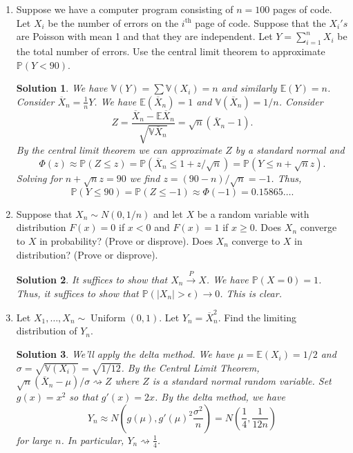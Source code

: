 \documentclass[10pt]{article}
\newtheorem*{sol}{Solution}
\renewcommand{\P}{\mathbb{P}}
\newcommand{\V}{\mathbb{V}}
\newcommand{\E}{\mathbb{E}}
\newcommand{\Unif}{\operatorname{Uniform}}
\newcommand{\toP}{\xrightarrow{P}}
\begin{document}
\begin{enumerate}
\item[(8)] Suppose we have a computer program consisting of $n = 100$ pages of
code. Let $X_i$ be the number of errors on the $i^{\text{th}}$ page of code.
Suppose that the $X_i's$ are Poisson with mean 1 and that they are independent.
Let $Y=\sum_{i=1}^n X_i$ be the total number of errors. Use the central limit
theorem to approximate $\P(Y<90)$.

\begin{sol}
We have $\V(Y)=\sum \V(X_i)=n$ and similarly $\E(Y)=n$.
Consider $\overline X_n=\frac{1}{n}Y$. We have $\E(\overline X_n)=1$
and $\V(\overline X_n)=1/n$. Consider
\[
Z = \frac{\overline X_n - \E \overline X_n}{\sqrt{\V \overline X_n}}
= \sqrt{n}(\overline X_n -1).
\]
By the central limit theorem we can approximate $Z$ by a standard normal and
\[
\Phi(z) \approx \P(Z\leq z) = \P(\overline X_n \leq 1 + z/\sqrt{n})
= \P(Y \leq n + \sqrt{n}z).
\]
Solving for $n+\sqrt{n}z=90$ we find $z=(90-n)/\sqrt{n}=-1$. Thus,
\[
\P(Y\leq 90) = \P(Z\leq -1) \approx \Phi(-1) = 0.15865\ldots.
\]
\end{sol}

\item[(11)] Suppose that $X_n\sim N(0,1/n)$ and let $X$ be a random variable with
distribution $F(x) = 0$ if $x<0$ and $F(x) = 1$ if $x\geq 0$. Does $X_n$ converge
to $X$ in probability? (Prove or disprove). Does $X_n$ converge to $X$ in
distribution? (Prove or disprove).

\begin{sol}
It suffices to show that $X_n\toP X$. We have $\P(X=0)=1$.
Thus, it suffices to show that $\P(|X_n|>\epsilon)\to 0$. This is clear.
\end{sol}

\item[(14)] Let $X_1,\ldots,X_n\sim \Unif(0,1)$. Let $Y_n=\overline X_n^2$.
Find the limiting distribution of $Y_n$.

\begin{sol}
We'll apply the delta method. We have $\mu=\E(X_i)=1/2$ and
$\sigma=\sqrt{\V(X_i)}=\sqrt{1/12}$. By the Central Limit Theorem,
$\sqrt{n}(\overline X_n - \mu)/\sigma\rightsquigarrow Z$ where $Z$ is a
standard normal random variable. Set $g(x)=x^2$ so that $g'(x)=2x$.
By the delta method, we have
\[
Y_n \approx N\left(g(\mu), g'(\mu)^2 \frac{\sigma^2}{n}\right) =
N\left(\frac{1}{4}, \frac{1}{12n}\right)
\]
for large $n$. In particular, $Y_n \rightsquigarrow \frac{1}{4}$.
\end{sol}


\end{enumerate}
\end{document}
